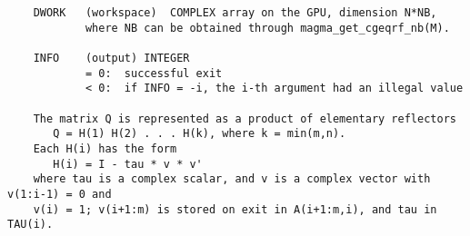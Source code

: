 \documentclass[10pt]{book}
\begin{document}
\begin{verbatim}
    DWORK   (workspace)  COMPLEX array on the GPU, dimension N*NB,
            where NB can be obtained through magma_get_cgeqrf_nb(M).

    INFO    (output) INTEGER   
            = 0:  successful exit   
            < 0:  if INFO = -i, the i-th argument had an illegal value   

    The matrix Q is represented as a product of elementary reflectors   
       Q = H(1) H(2) . . . H(k), where k = min(m,n).   
    Each H(i) has the form   
       H(i) = I - tau * v * v'   
    where tau is a complex scalar, and v is a complex vector with v(1:i-1) = 0 and 
    v(i) = 1; v(i+1:m) is stored on exit in A(i+1:m,i), and tau in TAU(i).   
\end{verbatim}

\newpage
\end{document}
